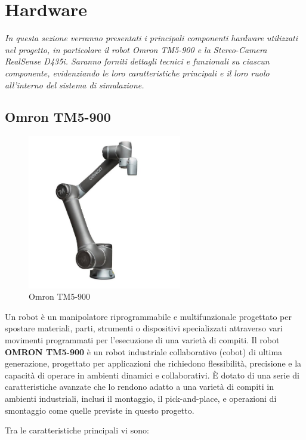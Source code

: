 \documentclass[11pt]{report}
\begin{document}
\section{Hardware}
\textit{In questa sezione verranno presentati i principali componenti hardware utilizzati nel progetto, in particolare il robot Omron TM5-900 e la Stereo-Camera RealSense D435i. Saranno forniti dettagli tecnici e funzionali su ciascun componente, evidenziando le loro caratteristiche principali e il loro ruolo all'interno del sistema di simulazione.}

\subsection{Omron TM5-900}
\begin{figure}[h!]
    \centering
    \includegraphics[width=0.6\textwidth]{images/omron.png}
    \caption{Omron TM5-900}
    \label{fig:omron}
\end{figure}

Un robot è un manipolatore riprogrammabile e multifunzionale progettato per spostare materiali, parti, strumenti o dispositivi specializzati attraverso vari movimenti programmati per l'esecuzione di una varietà di compiti. Il robot \textbf{OMRON TM5-900} è un robot industriale collaborativo (cobot) di ultima generazione, progettato per applicazioni che richiedono flessibilità, precisione e la capacità di operare in ambienti dinamici e collaborativi. È dotato di una serie di caratteristiche avanzate che lo rendono adatto a una varietà di compiti in ambienti industriali, inclusi il montaggio, il pick-and-place, e operazioni di smontaggio come quelle previste in questo progetto.

Tra le caratteristiche principali vi sono:
\end{document}
